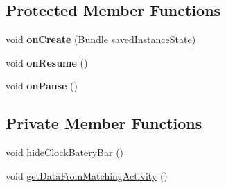 \subsection*{Protected Member Functions}
\begin{DoxyCompactItemize}
\item 
void {\bfseries on\+Create} (Bundle saved\+Instance\+State)\hypertarget{classcom_1_1example_1_1sebastian_1_1tindertp_1_1FullScreenViewActivity_af5c079a6d858da39f42f1cdcff02cf8a}{}\label{classcom_1_1example_1_1sebastian_1_1tindertp_1_1FullScreenViewActivity_af5c079a6d858da39f42f1cdcff02cf8a}

\item 
void {\bfseries on\+Resume} ()\hypertarget{classcom_1_1example_1_1sebastian_1_1tindertp_1_1FullScreenViewActivity_a11ef77e48b21bfe2bb4749964c62a20e}{}\label{classcom_1_1example_1_1sebastian_1_1tindertp_1_1FullScreenViewActivity_a11ef77e48b21bfe2bb4749964c62a20e}

\item 
void {\bfseries on\+Pause} ()\hypertarget{classcom_1_1example_1_1sebastian_1_1tindertp_1_1FullScreenViewActivity_a8a717e98199ba34bacdfe4b6d7a911be}{}\label{classcom_1_1example_1_1sebastian_1_1tindertp_1_1FullScreenViewActivity_a8a717e98199ba34bacdfe4b6d7a911be}

\end{DoxyCompactItemize}
\subsection*{Private Member Functions}
\begin{DoxyCompactItemize}
\item 
void \hyperlink{classcom_1_1example_1_1sebastian_1_1tindertp_1_1FullScreenViewActivity_a666951a13ab334846984245c0af2bc5d}{hide\+Clock\+Batery\+Bar} ()
\item 
void \hyperlink{classcom_1_1example_1_1sebastian_1_1tindertp_1_1FullScreenViewActivity_a0843ad0a4eb38e0597a3ca1a6b698f53}{get\+Data\+From\+Matching\+Activity} ()
\end{DoxyCompactItemize}
